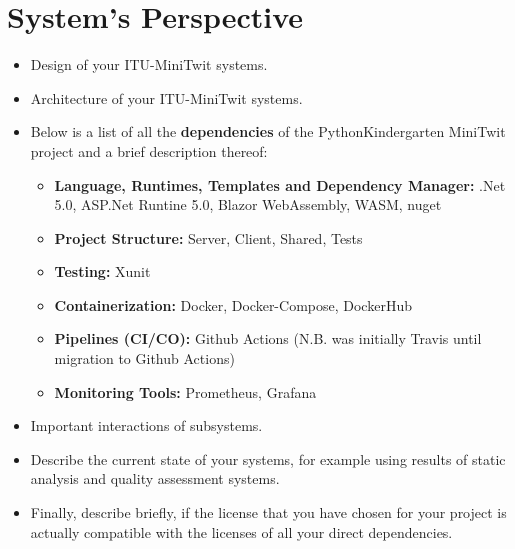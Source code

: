\section{System's Perspective}

\begin{itemize}
  \item Design of your ITU-MiniTwit systems.
  \item Architecture of your ITU-MiniTwit systems.
  \item Below is a list of all the \textbf{dependencies} of the PythonKindergarten MiniTwit project and a brief description thereof:
    \begin{itemize}
      \item \textbf{Language, Runtimes, Templates and Dependency Manager:}
      .Net 5.0, ASP.Net Runtine 5.0, Blazor WebAssembly, WASM, nuget
      \item \textbf{Project Structure:} Server, Client, Shared, Tests
      \item \textbf{Testing:} Xunit
      \item \textbf{Containerization:} Docker, Docker-Compose, DockerHub
      \item \textbf{Pipelines (CI/CO):} Github Actions (N.B. was initially Travis until migration to Github Actions)
      \item \textbf{Monitoring Tools:} Prometheus, Grafana
  
    \end{itemize}
  \item Important interactions of subsystems.
  \item Describe the current state of your systems, for example using results of static analysis and quality assessment systems.
  \item Finally, describe briefly, if the license that you have chosen for your project is actually compatible with the licenses of all your direct dependencies.
  
\end{itemize}